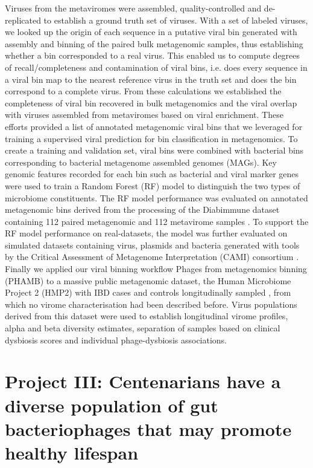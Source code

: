 \noindent
Viruses from the metaviromes were assembled, quality-controlled and de-replicated to establish a ground truth set of viruses. With a set of labeled viruses, we looked up the origin of each sequence in a putative viral bin generated with assembly and binning of the paired bulk metagenomic samples, thus establishing whether a bin corresponded to a real virus. This enabled us to compute degrees of recall/completeness and contamination of viral bins, i.e. does every sequence in a viral bin map to the nearest reference virus in the truth set and does the bin correspond to a complete virus. From these calculations we established the completeness of viral bin recovered in bulk metagenomics and the viral overlap with viruses assembled from metaviromes based on viral enrichment. These efforts provided a list of annotated metagenomic viral bins that we leveraged for training a supervised viral prediction for bin classification in metagenomics. To create a training and validation set, viral bins were combined with bacterial bins corresponding to bacterial metagenome assembled genomes (MAGs). Key genomic features recorded for each bin such as bacterial and viral marker genes were used to train a Random Forest (RF) model to distinguish the two types of microbiome constituents. The RF model performance was evaluated on annotated metagenomic bins derived from the processing of the Diabimmune dataset containing 112 paired metagenomic and 112 metavirome samples \cite{Zhao2017-uf}. To support the RF model performance on real-datasets, the model was further evaluated on simulated datasets containing virus, plasmids and bacteria generated with tools by the Critical Assessment of Metagenome Interpretation (CAMI) consortium \cite{Fritz2019-ej}.\\
\noindent
Finally we applied our viral binning workflow Phages from metagenomics binning (PHAMB) to a massive public metagenomic dataset, the Human Microbiome Project 2 (HMP2) with IBD cases and controls longitudinally sampled \cite{Lloyd-Price2019-cw}, from which no virome characterisation had been described before. Virus populations derived from this dataset were used to establish longitudinal virome profiles, alpha and beta diversity estimates, separation of samples based on clinical dysbiosis scores and individual phage-dysbiosis associations.

\section{Project III: Centenarians have a diverse population of gut bacteriophages that may promote healthy lifespan}

